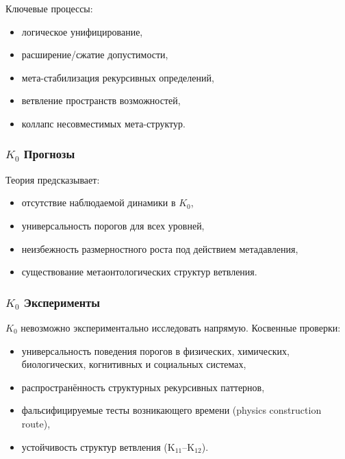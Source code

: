 Ключевые процессы:
\begin{itemize}
    \item логическое унифицирование,
    \item расширение/сжатие допустимости,
    \item мета-стабилизация рекурсивных определений,
    \item ветвление пространств возможностей,
    \item коллапс несовместимых мета-структур.
\end{itemize}

\subsubsection{\texorpdfstring{$K_0$}{K_0} Прогнозы}

Теория предсказывает:
\begin{itemize}
    \item отсутствие наблюдаемой динамики в $K_0$,
    \item универсальность порогов для всех уровней,
    \item неизбежность размерностного роста под действием метадавления,
    \item существование метаонтологических структур ветвления.
\end{itemize}

\subsubsection{\texorpdfstring{$K_0$}{K_0} Эксперименты}

$K_0$ невозможно экспериментально исследовать напрямую.
Косвенные проверки:
\begin{itemize}
    \item универсальность поведения порогов в физических,
          химических, биологических, когнитивных и социальных системах,
    \item распространённость структурных рекурсивных паттернов,
    \item фальсифицируемые тесты возникающего времени (physics construction route),
    \item устойчивость структур ветвления (K$_{11}$–K$_{12}$).
\end{itemize}

